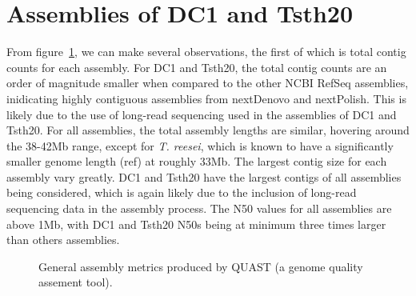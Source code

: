 \section{Assemblies of DC1 and Tsth20}

From figure~\ref{assemblies}, we can make several observations, the
first of which is total contig counts for each assembly. For DC1 and
Tsth20, the total contig counts are an order of magnitude smaller when
compared to the other NCBI RefSeq assemblies, inidicating highly
contiguous assemblies from nextDenovo and nextPolish. This is likely
due to the use of long-read sequencing used in the assemblies of DC1
and Tsth20. For all assemblies, the total assembly lengths are
similar, hovering around the 38-42Mb range, except for
\textit{T. reesei}, which is known to have a significantly smaller
genome length (ref) at roughly 33Mb. The largest contig size for each
assembly vary greatly. DC1 and Tsth20 have the largest contigs of all
assemblies being considered, which is again likely due to the
inclusion of long-read sequencing data in the assembly process. The
N50 values for all assemblies are above 1Mb, with DC1 and Tsth20 N50s
being at minimum three times larger than others assemblies.

\begin{figure}
  \centering
  \caption{General assembly metrics produced by QUAST (a
    genome quality assement tool).}
  \label{assemblies}
\end{figure}
